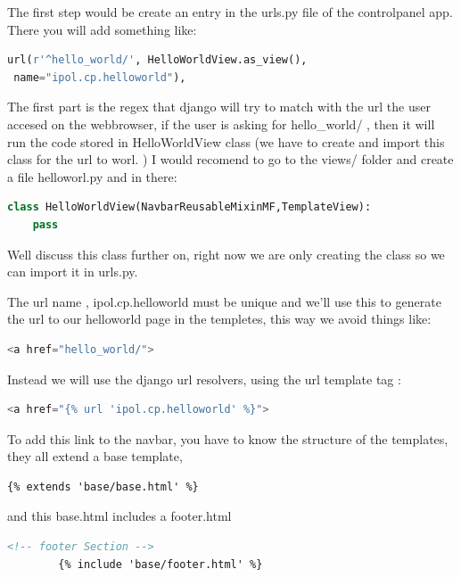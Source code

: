 The first step would be create an entry in the urls.py file of the controlpanel app.
There you will add something like:

\begin{lstlisting}[language=Python,firstnumber=1]
url(r'^hello_world/', HelloWorldView.as_view(),
 name="ipol.cp.helloworld"),
\end{lstlisting}

The first part is the regex that django will try to match with the url the user accesed on the webbrowser, if the user is asking for hello\_world/ , then it will run the code stored in HelloWorldView class (we have to create and import this class for the url to worl. )
I would recomend to go to the views/ folder and create a file helloworl.py and in there:

\begin{lstlisting}[language=Python,firstnumber=1]
class HelloWorldView(NavbarReusableMixinMF,TemplateView):
	pass
\end{lstlisting}

Well discuss this class further on, right now we are only creating the class so we can import it in urls.py.

The url name , ipol.cp.helloworld must be unique and we'll use this to generate the url to our helloworld page in the templetes, this way we avoid things like: 

\begin{lstlisting}[language=Python,firstnumber=1]
<a href="hello_world/">
\end{lstlisting}

Instead we will use the django url resolvers, using the url template tag :

\begin{lstlisting}[language=Python,firstnumber=1]
<a href="{% url 'ipol.cp.helloworld' %}">
\end{lstlisting}

To add this link to the navbar, you have to know the structure of the templates, they all extend a base template, 

\begin{lstlisting}[language=html,firstnumber=1]
{% extends 'base/base.html' %}
\end{lstlisting}

and this base.html includes a footer.html

\begin{lstlisting}[language=html,firstnumber=1]
        <!-- footer Section -->
        {% include 'base/footer.html' %}
\end{lstlisting}

